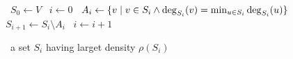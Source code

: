 \begin{algorithm}
    \begin{algorithmic}%
            \State~$S_0 \gets V$
            \State~$i \gets 0$
                    \State~$A_i \gets \{ v \; \vert \; v \in S_i \wedge \deg_{S_i}(v) = \min_{u \in S_i} \deg_{S_i}(u) \} $
                    \State~$S_{i+1} \gets S_i \setminus A_i$
                    \State~$i \gets i+1$
                \EndWhile
                
            \Return~a set $S_i$ having larget density $\rho(S_i)$
        \EndProcedure
    \end{algorithmic}
\end{algorithm}